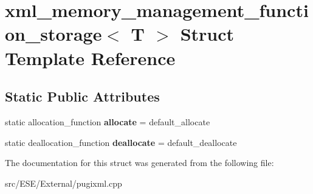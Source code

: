 \hypertarget{structxml__memory__management__function__storage}{\section{xml\-\_\-memory\-\_\-management\-\_\-function\-\_\-storage$<$ T $>$ Struct Template Reference}
\label{structxml__memory__management__function__storage}
}
\subsection*{Static Public Attributes}
\begin{DoxyCompactItemize}
\item 
\hypertarget{structxml__memory__management__function__storage_abb6865f8d07d27fd9273737c59f6e941}{static allocation\-\_\-function {\bfseries allocate} = default\-\_\-allocate}\label{structxml__memory__management__function__storage_abb6865f8d07d27fd9273737c59f6e941}

\item 
\hypertarget{structxml__memory__management__function__storage_a1c80a9a045ed6cfb90b17a178e4b3512}{static deallocation\-\_\-function {\bfseries deallocate} = default\-\_\-deallocate}\label{structxml__memory__management__function__storage_a1c80a9a045ed6cfb90b17a178e4b3512}

\end{DoxyCompactItemize}


The documentation for this struct was generated from the following file\-:\begin{DoxyCompactItemize}
\item 
src/\-E\-S\-E/\-External/pugixml.\-cpp\end{DoxyCompactItemize}
